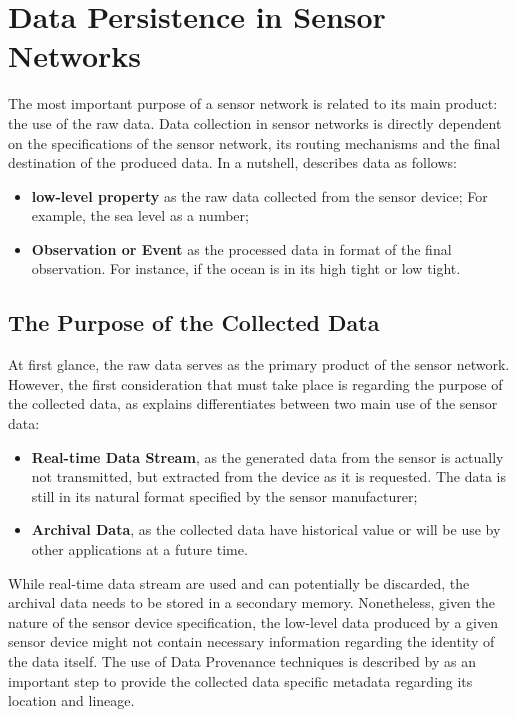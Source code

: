 \section{Data Persistence in Sensor Networks}

The most important purpose of a sensor network is related to its main product:
the use of the raw data. Data collection in sensor networks is directly
dependent on the specifications of the sensor network, its routing mechanisms
and the final destination of the produced data. In a nutshell,
\cite{sn-storage03} describes data as follows:

\begin{itemize}
  \item \textbf{low-level property} as the raw data collected from the
  sensor device; For example, the sea level as a number;
  \item \textbf{Observation or Event} as the processed data in format of the final
  observation. For instance, if the ocean is in its high tight or low tight.
\end{itemize}

\subsection{The Purpose of the Collected Data}
\label{sec:sn-data-purpose}

At first glance, the raw data serves as the primary product of the sensor
network. However, the first consideration that must take place is regarding the
purpose of the collected data, as \cite{sn-provenance01} explains
differentiates between two main use of the sensor data:

\begin{itemize}
  \item \textbf{Real-time Data Stream}, as the generated data from the sensor is
  actually not transmitted, but extracted from the device as it is requested.
  The data is still in its natural format specified by the sensor manufacturer;
  \item \textbf{Archival Data}, as the collected data have historical value or will
  be use by other applications at a future time. 
\end{itemize}

While real-time data stream are used and can potentially be discarded, the
archival data needs to be stored in a secondary memory. Nonetheless, given the
nature of the sensor device specification, the low-level data produced
by a given sensor device might not contain necessary information regarding the
identity of the data itself. The use of Data Provenance techniques is described
by \cite{sn-provenance01} as an important step to provide the collected data 
specific metadata regarding its location and lineage.

